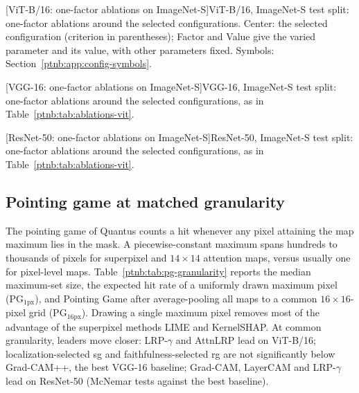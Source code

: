 \begin{center}
    \captionsetup{hypcap=false}
    [ViT-B/16: one-factor ablations on ImageNet-S]{ViT-B/16, ImageNet-S test split: one-factor ablations around the selected
    configurations. Center: the selected configuration (criterion in parentheses); Factor and Value give the varied parameter and its value, with other parameters fixed. Symbols: Section~\ref{ptnb:app:config-symbols}.}
    \label{ptnb:tab:ablations-vit}
\end{center}
\captionsetup{hypcap=true}
{\small{}}

\begin{center}
    \captionsetup{hypcap=false}
    [VGG-16: one-factor ablations on ImageNet-S]{VGG-16, ImageNet-S test split: one-factor ablations around the selected
    configurations, as in Table~\ref{ptnb:tab:ablations-vit}.}
    \label{ptnb:tab:ablations-vgg}
\end{center}
\captionsetup{hypcap=true}
{\small{}}

\begin{center}
    \captionsetup{hypcap=false}
    [ResNet-50: one-factor ablations on ImageNet-S]{ResNet-50, ImageNet-S test split: one-factor ablations around the selected
    configurations, as in Table~\ref{ptnb:tab:ablations-vit}.}
    \label{ptnb:tab:ablations-resnet}
\end{center}
\captionsetup{hypcap=true}
{\small{}}

\subsection{Pointing game at matched granularity}\label{ptnb:app:pg-granularity}

The pointing game of Quantus counts a hit whenever any pixel attaining the map maximum lies in the mask. A piecewise-constant maximum spans hundreds to thousands of pixels for superpixel and $14{\times}14$ attention maps, versus usually one for pixel-level maps. Table~\ref{ptnb:tab:pg-granularity} reports the median maximum-set size, the expected hit rate of a uniformly drawn maximum pixel (PG$_{1\mathrm{px}}$), and Pointing Game after average-pooling all maps to a common $16{\times}16$-pixel grid (PG$_{16\mathrm{px}}$). Drawing a single maximum pixel removes most of the advantage of the superpixel methods LIME and KernelSHAP. At common granularity, leaders move closer: LRP-$\gamma$ and AttnLRP lead on ViT-B/16; localization-selected \ac{sg} and faithfulness-selected \ac{rg} are not significantly below Grad-CAM++, the best VGG-16 baseline; Grad-CAM, LayerCAM and LRP-$\gamma$ lead on ResNet-50 (McNemar tests against the best baseline).

